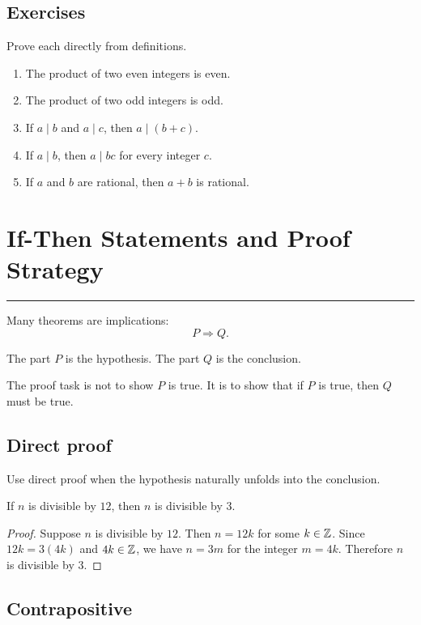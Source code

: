 \documentclass[12pt]{article}
\newcommand{\chapterline}{\vspace{0.4em}\hrule\vspace{0.8em}}
\begin{document}
\subsection{Exercises}

Prove each directly from definitions.

\begin{enumerate}
\item The product of two even integers is even.
\item The product of two odd integers is odd.
\item If $a\mid b$ and $a\mid c$, then $a\mid(b+c)$.
\item If $a\mid b$, then $a\mid bc$ for every integer $c$.
\item If $a$ and $b$ are rational, then $a+b$ is rational.
\end{enumerate}

\newpage
\section{If-Then Statements and Proof Strategy}
\chapterline

Many theorems are implications:
\[
P\Rightarrow Q.
\]

The part $P$ is the hypothesis. The part $Q$ is the conclusion.

The proof task is not to show $P$ is true. It is to show that if $P$ is true, then $Q$ must be true.

\subsection{Direct proof}

Use direct proof when the hypothesis naturally unfolds into the conclusion.

\begin{theorem}
If $n$ is divisible by $12$, then $n$ is divisible by $3$.
\end{theorem}

\begin{proof}
Suppose $n$ is divisible by $12$. Then $n=12k$ for some $k\in\mathbb{Z}$. Since $12k=3(4k)$ and $4k\in\mathbb{Z}$, we have $n=3m$ for the integer $m=4k$. Therefore $n$ is divisible by $3$.
\end{proof}

\subsection{Contrapositive}
\end{document}
